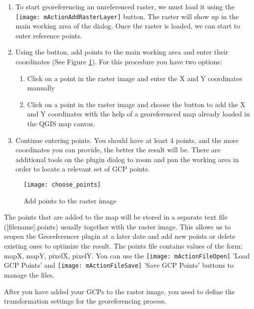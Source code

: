 \begin{enumerate}
\item To start georeferencing an unreferenced raster, we must load it using 
the \texttt{[image: mActionAddRasterLayer]} button. The raster 
will show up in the main working area of the dialog. Once the raster is 
loaded, we can start to enter reference points.
\item Using the  button, add 
points to the main working area and enter their coordinates 
(See Figure \ref{fig:choose_points}). For this procedure you have two 
options:

\begin{enumerate}
\item Click on a point in the raster image and enter the X and Y coordinates manually
\item Click on a point in the raster image and choose the button 
 to add the X and Y coordinates with the help 
of a georeferenced map already loaded in the QGIS map canvas.
\end{enumerate}
\item Continue entering points. You should have at least 4 points, and the 
more coordinates you can provide, the better the result will be. There are 
additional tools on the plugin dialog to zoom and pan the working area in 
order to locate a relevant set of GCP points.
\end{enumerate}

\begin{figure}[ht]
\centering
  \texttt{[image: choose\_points]}
  \caption{Add points to the raster image \nixcaption}\label{fig:choose_points}
\end{figure}

The points that are added to the map will be stored in a separate text 
file ([filename].points) usually together with the raster image. 
This allows us to reopen the Georeferencer plugin at a later date and add 
new points or delete existing ones to optimize the result. The points file 
contains values of the form: mapX, mapY, pixelX, pixelY. You can use the 
\texttt{[image: mActionFileOpen]} 'Load GCP Points' and 
\texttt{[image: mActionFileSave]} 'Save GCP Points' buttons to 
manage the files.

\label{georeferencer_transformation}

After you have added your GCPs to the raster image, you need to define the 
transformation settings for the georeferencing process. 

